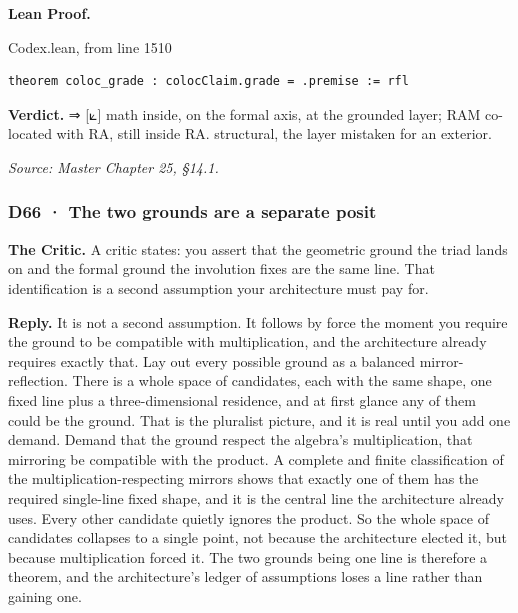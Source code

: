 \documentclass[10pt,twocolumn]{article}
\begin{document}
\textbf{Lean Proof.}

\begin{leanexcerpt}{Codex.lean, from line 1510}
\begin{lstlisting}[style=leanx,firstnumber=1510]
theorem coloc_grade : colocClaim.grade = .premise := rfl
\end{lstlisting}
\end{leanexcerpt}

\textbf{Verdict.} ⇒ {[}⟀{]} math inside, on the formal axis, at the
grounded layer; RAM co-located with RA, still inside RA. structural, the
layer mistaken for an exterior.

\emph{Source: Master Chapter 25, §14.1.}

\hypertarget{d66-the-two-grounds-are-a-separate-posit}{%
\subsubsection{D66 · The two grounds are a separate
posit}\label{d66-the-two-grounds-are-a-separate-posit}}

\textbf{The Critic.} A critic states: you assert that the geometric
ground the triad lands on and the formal ground the involution fixes are
the same line. That identification is a second assumption your
architecture must pay for.

\textbf{Reply.} It is not a second assumption. It follows by force the
moment you require the ground to be compatible with multiplication, and
the architecture already requires exactly that. Lay out every possible
ground as a balanced mirror-reflection. There is a whole space of
candidates, each with the same shape, one fixed line plus a
three-dimensional residence, and at first glance any of them could be
the ground. That is the pluralist picture, and it is real until you add
one demand. Demand that the ground respect the algebra's multiplication,
that mirroring be compatible with the product. A complete and finite
classification of the multiplication-respecting mirrors shows that
exactly one of them has the required single-line fixed shape, and it is
the central line the architecture already uses. Every other candidate
quietly ignores the product. So the whole space of candidates collapses
to a single point, not because the architecture elected it, but because
multiplication forced it. The two grounds being one line is therefore a
theorem, and the architecture's ledger of assumptions loses a line
rather than gaining one.
\end{document}
